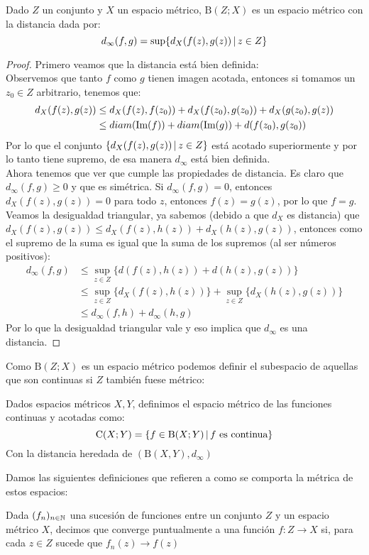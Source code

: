 \documentclass[12pt,a4paper]{book}
\begin{document}
\begin{teo} Dado $Z$ un conjunto y $X$ un espacio métrico, $\mathrm{B}(Z;X)$ es un espacio métrico con la distancia dada por:
$$ d_\infty(f,g) = \sup \{ d_X(f(z),g(z)) \,\vert\, z \in Z\}$$
\begin{proof}
Primero veamos que la distancia está bien definida:\\
Observemos que tanto $f$ como $g$ tienen imagen acotada, entonces si tomamos un $z_0 \in Z$ arbitrario, tenemos que:
\begin{align*}
d_X(f(z),g(z)) &\leq d_X(f(z),f(z_0)) + d_X(f(z_0),g(z_0)) + d_X(g(z_0),g(z)) \\
&\leq diam(\mbox{Im}(f)) + diam(\mbox{Im}(g)) + d(f(z_0),g(z_0))
\end{align*} 
Por lo que el conjunto $\{ d_X(f(z),g(z)) \,\vert\, z \in Z\}$ está acotado superiormente y por lo tanto tiene supremo, de esa manera $d_\infty$ está bien definida.\\
Ahora tenemos que ver que cumple las propiedades de distancia. Es claro que $d_\infty(f,g) \geq 0$ y que es simétrica. Si $d_\infty(f,g)=0$, entonces $d_X(f(z),g(z))=0$ para todo $z$, entonces $f(z)=g(z)$, por lo que $f=g$. Veamos la desigualdad triangular, ya sabemos (debido a que $d_X$ es distancia) que $d_X(f(z),g(z)) \leq d_X(f(z),h(z)) + d_X(h(z),g(z))$, entonces como el supremo de la suma es igual que la suma de los supremos (al ser números positivos):
\begin{align*}
d_\infty(f,g) &\leq \sup_{z \in Z} \{d(f(z),h(z)) + d(h(z),g(z))\}\\
&\leq \sup_{z \in Z} \{d_X(f(z),h(z))\} + \sup_{z \in Z} \{d_X(h(z),g(z))\}\\
&\leq d_\infty(f,h) + d_\infty(h,g)
\end{align*}
Por lo que la desigualdad triangular vale y eso implica que $d_\infty$ es una distancia.
\end{proof}
\end{teo}
Como $\mathrm{B}(Z;X)$ es un espacio métrico podemos definir el subespacio de aquellas que son continuas si $Z$ también fuese métrico:
\begin{defi}
Dados espacios métricos $X,Y$, definimos el espacio métrico de las funciones continuas y acotadas como:
$$ \mathrm{C}(X;Y)=\{f \in \mathrm{B}(X;Y) \,\vert\, f \mbox{ es continua}\}$$
Con la distancia heredada de $(\mathrm{B}(X,Y),d_\infty)$
\end{defi}
Damos las siguientes definiciones que refieren a como se comporta la métrica de estos espacios:
\begin{defi}
 Dada $(f_n)_{{n} \in \mathbb{N}}$ una sucesión de funciones entre un conjunto $Z$ y un espacio métrico $X$, decimos que converge puntualmente a una función $f:Z \rightarrow X$ si, para cada $z \in Z$ sucede que $f_n(z) \rightarrow f(z)$
\end{defi}
\end{document}
